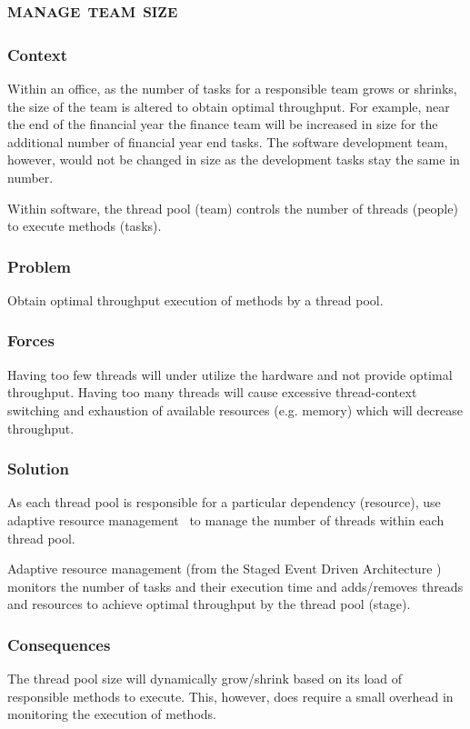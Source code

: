 \documentclass[prodmode]{style/acmlarge}
\begin{document}
\subsection{\textsc{\textbf{manage team size}}}

\subsubsection*{Context} Within an office, as the number of tasks for a
responsible team grows or shrinks, the size of the team is altered to obtain
optimal throughput.  For example, near the end of the financial year the finance
team will be increased in size for the additional number of financial year end
tasks.  The software development team, however, would not be changed in size as
the development tasks stay the same in number.

Within software, the thread pool (team) controls the number of threads (people)
to execute methods (tasks).

\subsubsection*{\textbf{Problem}} Obtain optimal throughput execution of methods by a
thread pool.

\subsubsection*{Forces} Having too few threads will under utilize the hardware
and not provide optimal throughput.  Having too many threads will cause
excessive thread-context switching and exhaustion of available resources (e.g.
memory) which will decrease throughput.

\subsubsection*{\textbf{Solution}} As each thread pool is responsible for a particular
dependency (resource), use adaptive resource management~\cite{seda} to manage
the number of threads within each thread pool.

Adaptive resource management (from the Staged Event Driven Architecture
\cite{seda}) monitors the number of tasks and their execution time and
adds/removes threads and resources to achieve optimal throughput by the thread
pool (stage).

\subsubsection*{Consequences} The thread pool size will dynamically grow/shrink
based on its load of responsible methods to execute.  This, however, does
require a small overhead in monitoring the execution of methods.
\end{document}
